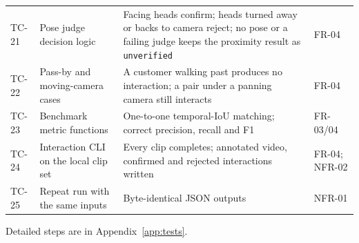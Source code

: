 \begin{longtable}{P{0.09\textwidth}P{0.3\textwidth}P{0.32\textwidth}P{0.14\textwidth}}
TC-21 & Pose judge decision logic & Facing heads confirm; heads turned away or backs to camera reject; no pose or a failing judge keeps the proximity result as \texttt{unverified} & FR-04\\
TC-22 & Pass-by and moving-camera cases & A customer walking past produces no interaction; a pair under a panning camera still interacts & FR-04\\
TC-23 & Benchmark metric functions & One-to-one temporal-IoU matching; correct precision, recall and F1 & FR-03/04\\
TC-24 & Interaction CLI on the local clip set & Every clip completes; annotated video, confirmed and rejected interactions written & FR-04; NFR-02\\
TC-25 & Repeat run with the same inputs & Byte-identical JSON outputs & NFR-01\\
\bottomrule
\end{longtable}
Detailed steps are in Appendix~\ref{app:tests}.

